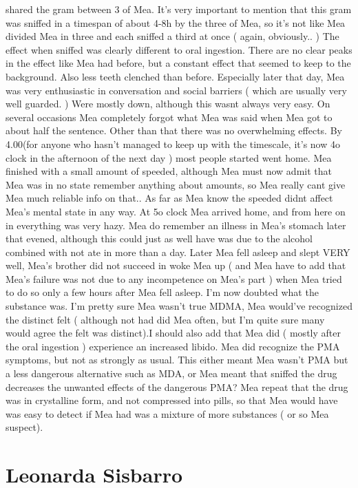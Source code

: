 \documentclass[12pt]{book}
\begin{document}
shared the gram between 3 of Mea. It's very important to mention that this gram was sniffed in a timespan of about 4-8h by the three of Mea, so it's not like Mea divided Mea in three and each sniffed a third at once ( again, obviously.. ) The effect when sniffed was clearly different to oral ingestion. There are no clear peaks in the effect like Mea had before, but a constant effect that seemed to keep to the background. Also less teeth clenched than before. Especially later that day, Mea was very enthusiastic in conversation and social barriers ( which are usually very well guarded. ) Were mostly down, although this wasnt always very easy. On several occasions Mea completely forgot what Mea was said when Mea got to about half the sentence. Other than that there was no overwhelming effects. By 4.00(for anyone who hasn't managed to keep up with the timescale, it's now 4o clock in the afternoon of the next day ) most people started went home. Mea finished with a small amount of speeded, although Mea must now admit that Mea was in no state remember anything about amounts, so Mea really cant give Mea much reliable info on that.. As far as Mea know the speeded didnt affect Mea's mental state in any way. At 5o clock Mea arrived home, and from here on in everything was very hazy. Mea do remember an illness in Mea's stomach later that evened, although this could just as well have was due to the alcohol combined with not ate in more than a day. Later Mea fell asleep and slept VERY well, Mea's brother did not succeed in woke Mea up ( and Mea have to add that Mea's failure was not due to any incompetence on Mea's part ) when Mea tried to do so only a few hours after Mea fell asleep. I'm now doubted what the substance was. I'm pretty sure Mea wasn't true MDMA, Mea would've recognized the distinct felt ( although not had did Mea often, but I'm quite sure many would agree the felt was distinct).I should also add that Mea did ( mostly after the oral ingestion ) experience an increased libido. Mea did recognize the PMA symptoms, but not as strongly as usual. This either meant Mea wasn't PMA but a less dangerous alternative such as MDA, or Mea meant that sniffed the drug decreases the unwanted effects of the dangerous PMA? Mea repeat that the drug was in crystalline form, and not compressed into pills, so that Mea would have was easy to detect if Mea had was a mixture of more substances ( or so Mea suspect).



\chapter{Leonarda Sisbarro}
\end{document}
